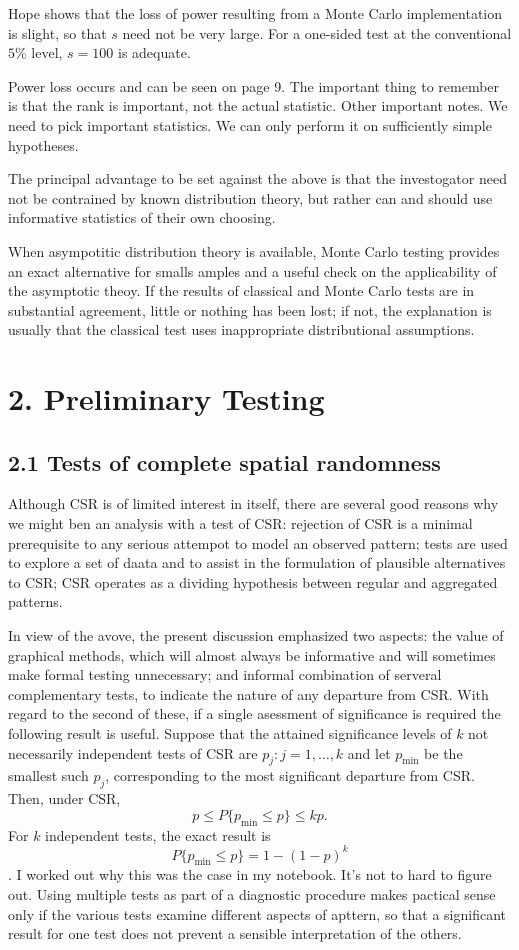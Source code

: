 \documentclass{article}
\begin{document}
Hope shows that the loss of power resulting from a Monte Carlo implementation is slight, so that $s$ need not be very large. For a one-sided test at the conventional $5\%$ level, $s = 100$ is adequate. 

Power loss occurs and can be seen on page 9. The important thing to remember is that the rank is important, not the actual statistic. Other important notes. We need to pick important statistics. We can only perform it on sufficiently simple hypotheses. 

The principal advantage to be set against the above is that the investogator need not be contrained by known distribution theory, but rather can and should use informative statistics of their own choosing.

When asympotitic distribution theory is available, Monte Carlo testing provides an exact alternative for smalls amples and a useful check on the applicability of the asymptotic theoy. If the results of classical and Monte Carlo tests are in substantial agreement, little or nothing has been lost; if not, the explanation is usually that the classical test uses inappropriate distributional assumptions.   

\section*{2. Preliminary Testing}
\subsection*{2.1 Tests of complete spatial randomness}
Although CSR is of limited interest in itself, there are several good reasons why we might ben an analysis with a test of CSR: rejection of CSR is a minimal prerequisite to any serious attempot to model an observed pattern; tests are used to explore a set of daata and to assist in the formulation of plausible alternatives to CSR; CSR operates as a dividing hypothesis between regular and aggregated patterns. 

In view of the avove, the present discussion emphasized two aspects: the value of graphical methods, which will almost always be informative and will sometimes make formal testing unnecessary; and informal combination of serveral complementary tests, to indicate the nature of any departure from CSR. With regard to the second of these, if a single asessment of significance is required the following result is useful. Suppose that the attained significance levels of $k$ not necessarily independent tests of CSR are $p_j:j = 1, \dots, k$ and let $p_{\text{min}}$ be the smallest such $p_j$, corresponding to the most significant departure from CSR. Then, under CSR, $$p \leq P\{p_{\text{min}} \leq  p \} \leq kp.$$ For $k$ independent tests, the exact result is $$P\{p_{\text{min}} \leq p\} = 1 - (1-p)^k$$. I worked out why this was the case in my notebook. It's not to hard to figure out. Using multiple tests as part of a diagnostic procedure makes pactical sense only if the various tests examine different aspects of apttern, so that a significant result for one test does not prevent a sensible interpretation of the others.
\end{document}
